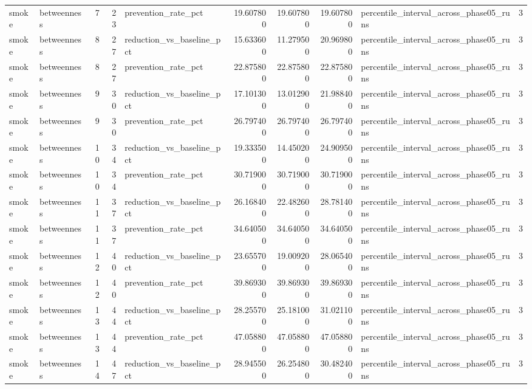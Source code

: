 \begin{tabular}{llrrlrrrlr}
smoke & betweenness & 7 & 23 & prevention\_rate\_pct & 19.607800 & 19.607800 & 19.607800 & percentile\_interval\_across\_phase05\_runs & 3 \\
smoke & betweenness & 8 & 27 & reduction\_vs\_baseline\_pct & 15.633600 & 11.279500 & 20.969800 & percentile\_interval\_across\_phase05\_runs & 3 \\
smoke & betweenness & 8 & 27 & prevention\_rate\_pct & 22.875800 & 22.875800 & 22.875800 & percentile\_interval\_across\_phase05\_runs & 3 \\
smoke & betweenness & 9 & 30 & reduction\_vs\_baseline\_pct & 17.101300 & 13.012900 & 21.988400 & percentile\_interval\_across\_phase05\_runs & 3 \\
smoke & betweenness & 9 & 30 & prevention\_rate\_pct & 26.797400 & 26.797400 & 26.797400 & percentile\_interval\_across\_phase05\_runs & 3 \\
smoke & betweenness & 10 & 34 & reduction\_vs\_baseline\_pct & 19.333500 & 14.450200 & 24.909500 & percentile\_interval\_across\_phase05\_runs & 3 \\
smoke & betweenness & 10 & 34 & prevention\_rate\_pct & 30.719000 & 30.719000 & 30.719000 & percentile\_interval\_across\_phase05\_runs & 3 \\
smoke & betweenness & 11 & 37 & reduction\_vs\_baseline\_pct & 26.168400 & 22.482600 & 28.781400 & percentile\_interval\_across\_phase05\_runs & 3 \\
smoke & betweenness & 11 & 37 & prevention\_rate\_pct & 34.640500 & 34.640500 & 34.640500 & percentile\_interval\_across\_phase05\_runs & 3 \\
smoke & betweenness & 12 & 40 & reduction\_vs\_baseline\_pct & 23.655700 & 19.009200 & 28.065400 & percentile\_interval\_across\_phase05\_runs & 3 \\
smoke & betweenness & 12 & 40 & prevention\_rate\_pct & 39.869300 & 39.869300 & 39.869300 & percentile\_interval\_across\_phase05\_runs & 3 \\
smoke & betweenness & 13 & 44 & reduction\_vs\_baseline\_pct & 28.255700 & 25.181000 & 31.021100 & percentile\_interval\_across\_phase05\_runs & 3 \\
smoke & betweenness & 13 & 44 & prevention\_rate\_pct & 47.058800 & 47.058800 & 47.058800 & percentile\_interval\_across\_phase05\_runs & 3 \\
smoke & betweenness & 14 & 47 & reduction\_vs\_baseline\_pct & 28.945500 & 26.254800 & 30.482400 & percentile\_interval\_across\_phase05\_runs & 3 \\

\end{tabular}

